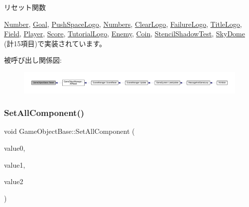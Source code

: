 リセット関数 



\mbox{\hyperlink{class_number_a7c6facdb1b3d0acc8309e0a915863d44}{Number}}, \mbox{\hyperlink{class_goal_a98b797c8012ab43d6fc8c42e4e91466b}{Goal}}, \mbox{\hyperlink{class_push_space_logo_afa163b1aff8df494b4f09f378bf983f0}{Push\+Space\+Logo}}, \mbox{\hyperlink{class_numbers_a1ab67e439ba1695c8fd545dfc1650990}{Numbers}}, \mbox{\hyperlink{class_clear_logo_aa19369cbace0cc79957ef7b4d4dbd0f5}{Clear\+Logo}}, \mbox{\hyperlink{class_failure_logo_a542b1617087a6701f7edb345e2a72e01}{Failure\+Logo}}, \mbox{\hyperlink{class_title_logo_a8bca39d06592b95b26024c2d86ac349c}{Title\+Logo}}, \mbox{\hyperlink{class_field_a5b140074dcca821ac702da348238c6d4}{Field}}, \mbox{\hyperlink{class_player_a457153d0edd58932e37e1356f5fe5fed}{Player}}, \mbox{\hyperlink{class_score_ad01d461a2b6ca345858b2ae0a3d81cc1}{Score}}, \mbox{\hyperlink{class_tutorial_logo_a2c9e22c81cfeafbd34f50cc766a66cf1}{Tutorial\+Logo}}, \mbox{\hyperlink{class_enemy_ab86571061e7fcabcf8c646b1abad5581}{Enemy}}, \mbox{\hyperlink{class_coin_a52c50229ce7c1e0f459e198adac70c8d}{Coin}}, \mbox{\hyperlink{class_stencil_shadow_test_a7691120143c64b99d6c8f5391be56e83}{Stencil\+Shadow\+Test}}, \mbox{\hyperlink{class_sky_dome_abc6f8ed1471d7b03f25924a849cae590}{Sky\+Dome}} (計15項目)で実装されています。

被呼び出し関係図\+:
\nopagebreak
\begin{figure}[H]
\begin{center}
\leavevmode
\includegraphics[width=350pt]{class_game_object_base_a85c59554f734bcb09f1a1e18d9517dce_icgraph}
\end{center}
\end{figure}
\mbox{\label{class_game_object_base_aad0e581dfba83d11af6412a0df6ecd90}} 
\subsubsection{\texorpdfstring{Set\+All\+Component()}{SetAllComponent()}}
{\footnotesize\ttfamily void Game\+Object\+Base\+::\+Set\+All\+Component (\begin{DoxyParamCaption}\item[{\mbox{\hyperlink{class_update_base}{Update\+Base}} $\ast$}]{value0,  }\item[{\mbox{\hyperlink{class_draw_base}{Draw\+Base}} $\ast$}]{value1,  }\item[{\mbox{\hyperlink{class_collision_base}{Collision\+Base}} $\ast$}]{value2 }\end{DoxyParamCaption})\hspace{0.3cm}{\ttfamily [inline]}}



